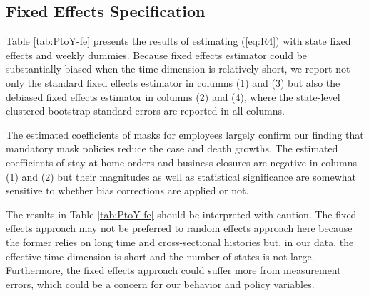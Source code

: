 \documentclass[11pt,reqno,letter]{amsart}
\theoremstyle{definition}
\begin{document}
\subsection{Fixed Effects Specification}

Table \ref{tab:PtoY-fe} presents the results of estimating (\ref{eq:R4})  with  state fixed effects and weekly dummies.  Because fixed effects estimator could be substantially biased when the time dimension is relatively short, we report not only the standard fixed effects estimator in columns (1) and (3) but also the debiased fixed effects estimator \citep[e.g.,][]{chen2019mastering} in columns (2) and (4), where the state-level clustered bootstrap standard errors are reported in all columns.

The estimated coefficients of masks for employees largely confirm our finding that mandatory mask policies reduce the case and death growths. The estimated coefficients of stay-at-home orders and business closures are negative in columns (1) and (2) but their magnitudes as well as statistical significance are somewhat sensitive to whether bias corrections are applied or not. %

The results in Table \ref{tab:PtoY-fe} should be interpreted with caution. The fixed effects approach may not be preferred to random effects approach here because the former relies on long time and cross-sectional histories but, in our data, the effective time-dimension is short and the number of states is not large. Furthermore, the fixed effects approach could suffer more from  measurement errors, which could be a concern for our behavior and policy variables.
\end{document}
